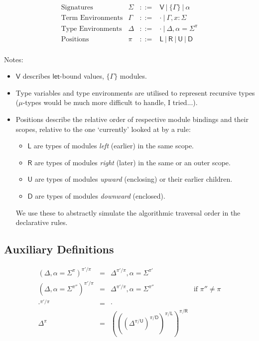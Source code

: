 \documentclass[10pt,a4paper]{article}
\newcommand\y[1]{\ensuremath{\mathsf{#1}}\xspace}
\newcommand\K[1]{\ensuremath{\textsf{#1}}}
\newcommand\note[1]{\noindent #1}
\begin{document}
\newcommand\UU{\y{U}}
\newcommand\DD{\y{D}}
\newcommand\LL{\y{L}}
\newcommand\RR{\y{R}}

$$
\begin{array}{lrcl}
\mbox{Signatures} & \Sigma &::=& \y{V} ~|~ \{\Gamma\} ~|~ \alpha \\
\mbox{Term Environments} & \Gamma &::=& {\cdot} ~|~ \Gamma,x{:}\Sigma \\
\mbox{Type Environments} & \Delta &::=& {\cdot} ~|~ \Delta,\alpha{=}\Sigma^\pi \\
\mbox{Positions} & \pi &::=& \LL ~|~ \RR ~|~ \UU ~|~ \DD \\
\end{array}
$$

\note{
Notes:
\begin{itemize}
\item $\y{V}$ describes \K{let}-bound values, $\{\Gamma\}$ modules.
\item Type variables and type environments are utilised to represent recursive types ($\mu$-types would be much more difficult to handle, I tried...).
\item Positions describe the relative order of respective module bindings and their scopes, relative to the one `currently' looked at by a rule:
  \begin{itemize}
  \item $\LL$ are types of modules \emph{left} (earlier) in the same scope.
  \item $\RR$ are types of modules \emph{right} (later) in the same or an outer scope.
  \item $\UU$ are types of modules \emph{upward} (enclosing) or their earlier children.
  \item $\DD$ are types of modules \emph{downward} (enclosed).
  \end{itemize}
We use these to abstractly simulate the algorithmic traversal order in the declarative rules.
\end{itemize}
}


\subsection*{Auxiliary Definitions}

$$
\begin{array}{rcll}
(\Delta, \alpha{=}\Sigma^\pi)^{\pi'/\pi} &=& \Delta^{\pi'/\pi}, \alpha{=}\Sigma^{\pi'} \\
(\Delta, \alpha{=}\Sigma^{\pi''})^{\pi'/\pi} &=& \Delta^{\pi'/\pi}, \alpha{=}\Sigma^{\pi''} &\mbox{if $\pi'' \neq \pi$} \\
\cdot^{\pi'/\pi} &=& \cdot \\
[0.9ex]
\Delta^\pi &=& (((\Delta^{\pi/\UU})^{\pi/\DD})^{\pi/\LL})^{\pi/\RR} \\
\end{array}
$$
\end{document}
